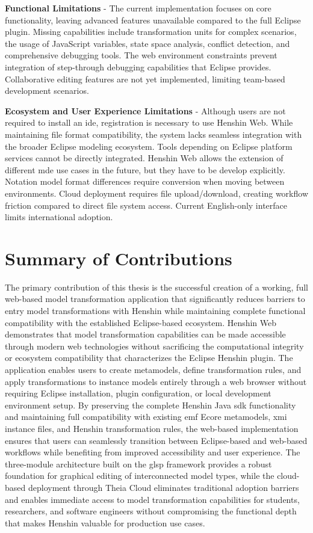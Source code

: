   \textbf{Functional Limitations} - The current implementation focuses on core functionality, leaving advanced features unavailable compared to the full Eclipse plugin. Missing capabilities include transformation units for complex scenarios, the usage of JavaScript variables, state space analysis, conflict detection, and comprehensive debugging tools. The web environment constraints prevent integration of step-through debugging capabilities that Eclipse provides. Collaborative editing features are not yet implemented, limiting team-based development scenarios.

  \textbf{Ecosystem and User Experience Limitations} - Although users are not required to install an \acs{ide}, registration is necessary to use Henshin Web. While maintaining file format compatibility, the system lacks seamless integration with the broader Eclipse modeling ecosystem. Tools depending on Eclipse platform services cannot be directly integrated. Henshin Web allows the extension of  different \ac{mde} use cases in the future, but they have to be develop explicitly. Notation model format differences require conversion when moving between environments. Cloud deployment requires file upload/download, creating workflow friction compared to direct file system access. Current English-only interface limits international adoption.

  \section{Summary of Contributions}
  \label{subsec:summary-contributions}

  The primary contribution of this thesis is the successful creation of a working, full web-based model transformation application that significantly reduces barriers to entry model transformations with Henshin while maintaining complete functional compatibility with the established Eclipse-based ecosystem. Henshin Web demonstrates that model transformation capabilities can be made accessible through modern web technologies without sacrificing the computational integrity or ecosystem compatibility that characterizes the Eclipse Henshin plugin. The application enables users to create metamodels, define transformation rules, and apply transformations to instance models entirely through a web browser without requiring Eclipse installation, plugin configuration, or local development environment setup. By preserving the complete Henshin Java \ac{sdk} functionality and maintaining full compatibility with existing \ac{emf} Ecore metamodels, \ac{xmi} instance files, and Henshin transformation rules, the web-based implementation ensures that users can seamlessly transition between Eclipse-based and web-based workflows while benefiting from improved accessibility and user experience. The three-module architecture built on the \ac{glsp} framework provides a robust foundation for graphical editing of interconnected model types, while the cloud-based deployment through Theia Cloud eliminates traditional adoption barriers and enables immediate access to model transformation capabilities for students, researchers, and software engineers without compromising the functional depth that makes Henshin valuable for production use cases. 

